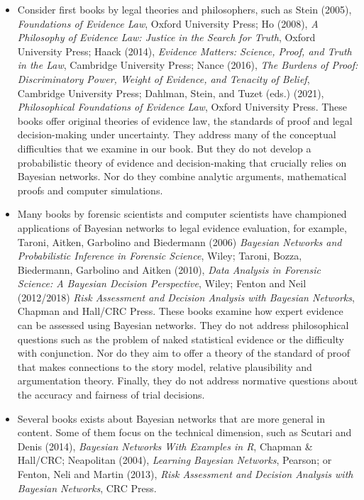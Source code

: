 \documentclass[
  10pt,
  dvipsnames,enabledeprecatedfontcommands]{scrartcl}
\begin{document}
\begin{itemize}

\item Consider first books by legal theories and philosophers, such as 
Stein (2005), \textit{Foundations of Evidence Law}, Oxford University Press; Ho (2008), \textit{A Philosophy of Evidence Law: Justice in the Search for Truth}, Oxford University Press; Haack (2014), \textit{Evidence Matters: Science, Proof, and Truth in the Law}, Cambridge University Press; Nance (2016), \textit{The Burdens of Proof: Discriminatory Power, Weight of Evidence, and Tenacity of Belief}, Cambridge University Press;    Dahlman, Stein, and Tuzet (eds.) (2021), \textit{Philosophical Foundations of Evidence Law}, Oxford University Press.
These books offer original theories of evidence law, the standards of proof and legal decision-making  under uncertainty.   They address many of the conceptual difficulties that we examine in our book. But they do not develop a probabilistic theory of evidence and decision-making that crucially relies on Bayesian networks.  Nor do they combine analytic arguments, mathematical proofs and computer simulations. 

\item  Many books by forensic scientists and computer scientists  have championed applications of Bayesian networks to legal evidence evaluation, for example, Taroni, Aitken, Garbolino and Biedermann (2006) \textit{Bayesian Networks and Probabilistic Inference in Forensic Science}, Wiley;   Taroni,  Bozza,  Biedermann, Garbolino and  Aitken (2010), \textit{Data Analysis in Forensic Science: A Bayesian Decision Perspective}, Wiley; Fenton and Neil (2012/2018) \textit{Risk Assessment and Decision Analysis with Bayesian Networks}, Chapman and Hall/CRC Press. These books examine how expert evidence can be assessed using Bayesian networks. They do not address philosophical questions such as the problem of naked statistical evidence or the difficulty with conjunction. Nor do they aim to offer a theory of the standard of proof that makes connections to the story model, relative plausibility and argumentation theory. Finally, they do not address normative questions about the accuracy and fairness of trial decisions.

\item Several books exists about Bayesian networks that are more general in content. Some of them focus on the technical dimension,  such as Scutari and  Denis (2014), \textit{Bayesian Networks With Examples in R}, Chapman \& Hall/CRC;  
Neapolitan (2004), \emph{Learning Bayesian Networks}, Pearson; or  Fenton, Neli and Martin (2013), \emph{Risk Assessment and Decision Analysis with Bayesian Networks}, CRC Press. 


\end{itemize}
\end{document}
